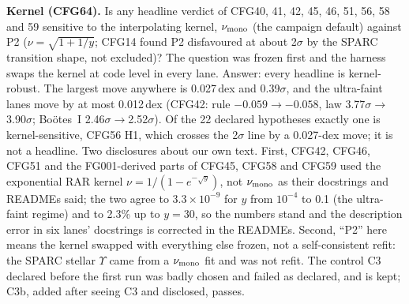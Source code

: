 \documentclass[10pt]{article}
\begin{document}
\textbf{Kernel (CFG64).} Is any headline verdict of CFG40, 41, 42, 45, 46, 51, 56, 58 and 59 sensitive to the interpolating kernel, $\nu_{\rm mono}$ (the campaign default) against P2 ($\nu=\sqrt{1+1/y}$; CFG14 found P2 disfavoured at about 2$\sigma$ by the SPARC transition shape, not excluded)? The question was frozen first and the harness swaps the kernel at code level in every lane. Answer: every headline is kernel-robust. The largest move anywhere is 0.027\,dex and 0.39$\sigma$, and the ultra-faint lanes move by at most 0.012\,dex (CFG42: rule $-0.059\to-0.058$, law 3.77$\sigma\to$3.90$\sigma$; Bo\"otes~I 2.46$\sigma\to$2.52$\sigma$). Of the 22 declared hypotheses exactly one is kernel-sensitive, CFG56 H1, which crosses the 2$\sigma$ line by a 0.027-dex move; it is not a headline. Two disclosures about our own text. First, CFG42, CFG46, CFG51 and the FG001-derived parts of CFG45, CFG58 and CFG59 used the exponential RAR kernel $\nu=1/(1-e^{-\sqrt y})$, not $\nu_{\rm mono}$ as their docstrings and READMEs said; the two agree to $3.3\times10^{-9}$ for $y$ from $10^{-4}$ to 0.1 (the ultra-faint regime) and to 2.3\% up to $y=30$, so the numbers stand and the description error in six lanes' docstrings is corrected in the READMEs. Second, ``P2'' here means the kernel swapped with everything else frozen, not a self-consistent refit: the SPARC stellar $\Upsilon$ came from a $\nu_{\rm mono}$ fit and was not refit. The control C3 declared before the first run was badly chosen and failed as declared, and is kept; C3b, added after seeing C3 and disclosed, passes.
\end{document}
